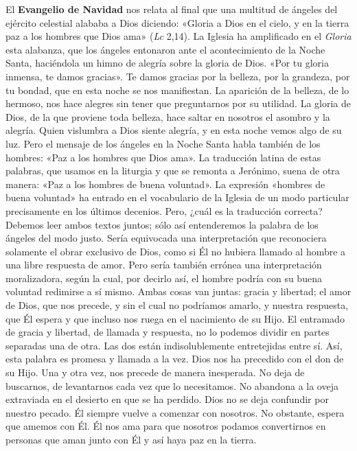 \documentclass[]{article}
\begin{document}
El \textbf{Evangelio de Navidad} nos relata al final que una multitud de
ángeles del ejército celestial alababa a Dios diciendo: «Gloria a Dios
en el cielo, y en la tierra paz a los hombres que Dios ama» (\emph{Lc}
2,14). La Iglesia ha amplificado en el \emph{Gloria} esta alabanza, que
los ángeles entonaron ante el acontecimiento de la Noche Santa,
haciéndola un himno de alegría sobre la gloria de Dios. «Por tu gloria
inmensa, te damos gracias». Te damos gracias por la belleza, por la
grandeza, por tu bondad, que en esta noche se nos manifiestan. La
aparición de la belleza, de lo hermoso, nos hace alegres sin tener que
preguntarnos por su utilidad. La gloria de Dios, de la que proviene toda
belleza, hace saltar en nosotros el asombro y la alegría. Quien
vislumbra a Dios siente alegría, y en esta noche vemos algo de su luz.
Pero el mensaje de los ángeles en la Noche Santa habla también de los
hombres: «Paz a los hombres que Dios ama». La traducción latina de estas
palabras, que usamos en la liturgia y que se remonta a Jerónimo, suena
de otra manera: «Paz a los hombres de buena voluntad». La expresión
«hombres de buena voluntad» ha entrado en el vocabulario de la Iglesia
de un modo particular precisamente en los últimos decenios. Pero, ¿cuál
es la traducción correcta? Debemos leer ambos textos juntos; sólo así
entenderemos la palabra de los ángeles del modo justo. Sería equivocada
una interpretación que reconociera solamente el obrar exclusivo de Dios,
como si Él no hubiera llamado al hombre a una libre respuesta de amor.
Pero sería también errónea una interpretación moralizadora, según la
cual, por decirlo así, el hombre podría con su buena voluntad redimirse
a sí mismo. Ambas cosas van juntas: gracia y libertad; el amor de Dios,
que nos precede, y sin el cual no podríamos amarlo, y nuestra respuesta,
que Él espera y que incluso nos ruega en el nacimiento de su Hijo. El
entramado de gracia y libertad, de llamada y respuesta, no lo podemos
dividir en partes separadas una de otra. Las dos están indisolublemente
entretejidas entre sí. Así, esta palabra es promesa y llamada a la vez.
Dios nos ha precedido con el don de su Hijo. Una y otra vez, nos precede
de manera inesperada. No deja de buscarnos, de levantarnos cada vez que
lo necesitamos. No abandona a la oveja extraviada en el desierto en que
se ha perdido. Dios no se deja confundir por nuestro pecado. Él siempre
vuelve a comenzar con nosotros. No obstante, espera que amemos con Él.
Él nos ama para que nosotros podamos convertirnos en personas que aman
junto con Él y así haya paz en la tierra.
\end{document}
